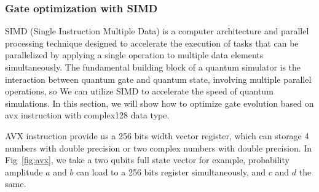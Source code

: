 \subsubsection{Gate optimization with SIMD}
SIMD (Single Instruction Multiple Data) is a computer architecture and parallel processing technique designed to accelerate the execution of tasks that can be parallelized by applying a single operation to multiple data elements simultaneously. The fundamental building block of a quantum simulator is the interaction between quantum gate and quantum state, involving multiple parallel operations, so We can utilize SIMD to accelerate the speed of quantum simulations. In this section, we will show how to optimize gate evolution based on avx instruction with complex128 data type.

AVX instruction provide us a 256 bits width vector register, which can storage 4 numbers with double precision or two complex numbers with double precision. In Fig~\ref{fig:avx}, we take a two qubits full state vector for example, probability amplitude $a$ and $b$ can load to a 256 bits register simultaneously, and $c$ and $d$ the same.

